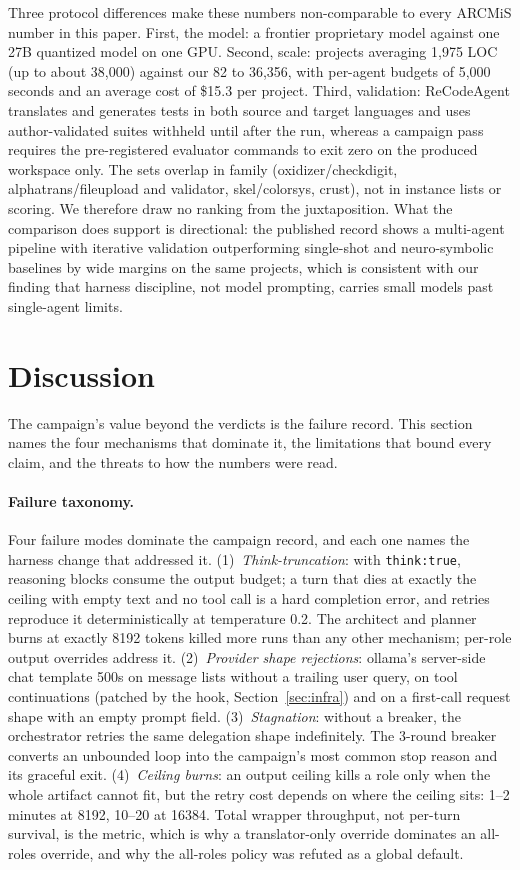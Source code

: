 \documentclass[11pt]{article}
\begin{document}
Three protocol differences make these numbers non-comparable to every
ARCMiS number in this paper. First, the model: a frontier proprietary
model against one 27B quantized model on one GPU. Second, scale:
projects averaging 1{,}975 LOC (up to about 38{,}000) against our
82 to 36{,}356, with per-agent budgets of 5{,}000 seconds and an
average cost of \$15.3 per project. Third, validation: ReCodeAgent
translates and generates tests in both source and target languages and
uses author-validated suites withheld until after the run, whereas a
campaign pass requires the pre-registered evaluator commands to exit
zero on the produced workspace only. The sets overlap in family
(oxidizer/checkdigit, alphatrans/fileupload and validator,
skel/colorsys, crust), not in instance lists or scoring. We therefore
draw no ranking from the juxtaposition. What the comparison does
support is directional: the published record shows a multi-agent
pipeline with iterative validation outperforming single-shot and
neuro-symbolic baselines by wide margins on the same projects, which is
consistent with our finding that harness discipline, not model
prompting, carries small models past single-agent limits.

\section{Discussion}
\label{sec:discussion}

The campaign's value beyond the verdicts is the failure record. This
section names the four mechanisms that dominate it, the limitations that
bound every claim, and the threats to how the numbers were read.

\paragraph{Failure taxonomy.}
Four failure modes dominate the campaign record, and each one names the
harness change that addressed it.
(1)~\emph{Think-truncation}: with \texttt{think:true}, reasoning blocks
consume the output budget; a turn that dies at exactly the ceiling with
empty text and no tool call is a hard completion error, and retries
reproduce it deterministically at temperature 0.2. The architect and
planner burns at exactly 8192 tokens killed more runs than any other
mechanism; per-role output overrides address it.
(2)~\emph{Provider shape rejections}: ollama's server-side chat template
500s on message lists without a trailing user query, on tool continuations
(patched by the hook, Section~\ref{sec:infra}) and on a first-call
request shape with an empty prompt field.
(3)~\emph{Stagnation}: without a breaker, the orchestrator retries the
same delegation shape indefinitely. The 3-round breaker converts an
unbounded loop into the campaign's most common stop reason and its
graceful exit.
(4)~\emph{Ceiling burns}: an output ceiling kills a role only when the
whole artifact cannot fit, but the retry cost depends on where the
ceiling sits: 1--2 minutes at 8192, 10--20 at 16384. Total wrapper
throughput, not per-turn survival, is the metric, which is why a
translator-only override dominates an all-roles override, and why the
all-roles policy was refuted as a global default.
\end{document}
